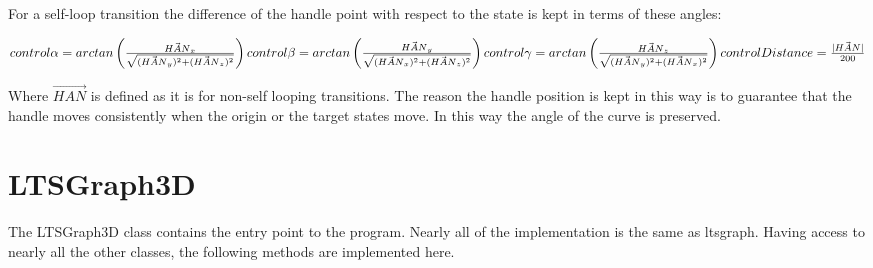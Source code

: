 \documentclass[a4paper]{article}
\begin{document}
For a self-loop transition the difference of the handle point with respect to the state is kept in terms of these angles:
\begin{center}
\begin{math}
\newline
control\alpha = arctan\left(\frac{\vec{HAN}_x}{\sqrt{(\vec{HAN}_y)^2 + (\vec{HAN}_z)^2}}\right) \newline
control\beta = arctan\left(\frac{\vec{HAN}_y}{\sqrt{(\vec{HAN}_x)^2 + (\vec{HAN}_z)^2}}\right) \newline
control\gamma = arctan\left(\frac{\vec{HAN}_z}{\sqrt{(\vec{HAN}_y)^2 + (\vec{HAN}_x)^2}}\right) \newline
controlDistance = \frac{|\vec{HAN}|}{200}
\end{math}
\end{center}
Where $\vec{HAN}$ is defined as it is for non-self looping transitions. \newline
The reason the handle position is kept in this way is to guarantee that the handle moves consistently when the origin or the target states move. In this way the angle of the curve is preserved.
\section{LTSGraph3D}
The LTSGraph3D class contains the entry point to the program. Nearly all of the implementation is the same as ltsgraph. Having access to nearly all the other classes, the following methods are implemented here.
\end{document}

